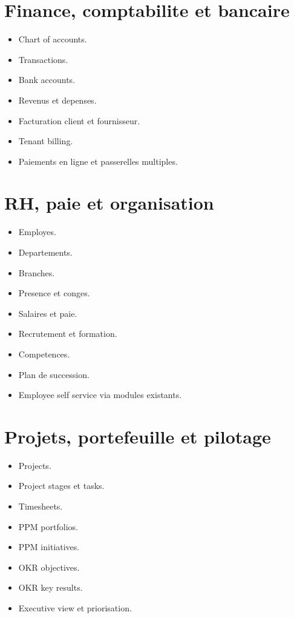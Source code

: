 \documentclass[11pt,a4paper]{article}
\begin{document}
\section{Finance, comptabilite et bancaire}
\begin{itemize}[leftmargin=1.2cm]
    \item Chart of accounts.
    \item Transactions.
    \item Bank accounts.
    \item Revenus et depenses.
    \item Facturation client et fournisseur.
    \item Tenant billing.
    \item Paiements en ligne et passerelles multiples.
\end{itemize}

\section{RH, paie et organisation}
\begin{itemize}[leftmargin=1.2cm]
    \item Employes.
    \item Departements.
    \item Branches.
    \item Presence et conges.
    \item Salaires et paie.
    \item Recrutement et formation.
    \item Competences.
    \item Plan de succession.
    \item Employee self service via modules existants.
\end{itemize}

\section{Projets, portefeuille et pilotage}
\begin{itemize}[leftmargin=1.2cm]
    \item Projects.
    \item Project stages et tasks.
    \item Timesheets.
    \item PPM portfolios.
    \item PPM initiatives.
    \item OKR objectives.
    \item OKR key results.
    \item Executive view et priorisation.
\end{itemize}
\end{document}
